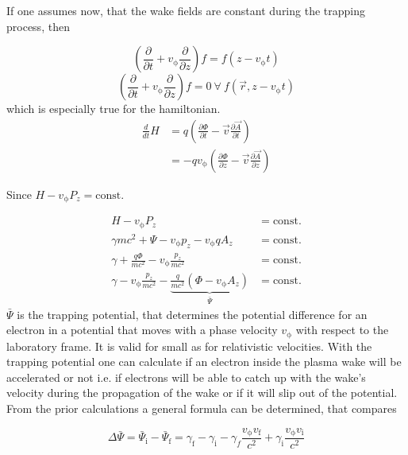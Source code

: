 If one assumes now, that the wake fields are constant during the trapping process, then 

\begin{equation}
(\frac{\partial}{\partial t}+v_\mathrm{\phi} \frac{\partial}{\partial z} ) f =   f ( z-v_\mathrm{\phi} t)
\end{equation}\begin{equation}
(\frac{\partial}{\partial t}+v_\mathrm{\phi} \frac{\partial}{\partial z} ) f =0 \ \forall \   f (\vec{r}, z-v_\mathrm{\phi} t)
\end{equation}
which is especially true for the hamiltonian.
\begin{align*}
\frac{d}{dt}H&=q(\frac{\partial \Phi}{\partial t}-\vec{v}\frac{\partial \vec{A}}{\partial t})\\
&=-q v_\mathrm{\phi}(\frac{\partial \Phi}{\partial z}-\vec{v} \frac{\partial \vec{A}}{\partial z}) 
\end{align*}

Since $H-v_\mathrm{\phi}P_z=\mathrm{const.}$

\begin{align}
H-v_\mathrm{\phi}P_z &= \mathrm{const.}\\
\gamma m c^2+\Psi-v_\mathrm{\phi}p_z-v_\mathrm{\phi}qA_z &= \mathrm{const.}\\
\gamma+\frac{q \Phi}{m c^2}-v_\mathrm{\phi} \frac{p_z}{mc^2} &= \mathrm{const.}\\
\gamma - v_\mathrm{\phi} \frac{p_z}{mc^2}- \underbrace{\frac{q}{mc^2}(\Phi-v_\mathrm{\phi}A_z)}_{\bar{\Psi}}  &= \mathrm{const.} 
\end{align}
$\bar{\Psi}$ is the trapping potential, that determines the potential difference for an electron in a potential that moves with a phase velocity $v_\mathrm{\phi}$ with respect to the laboratory frame. It is valid for small as for relativistic velocities.
With the trapping potential one can calculate if an electron inside the plasma wake will be accelerated or not i.e. if electrons will be able to catch up with the wake's velocity during the propagation of the wake or if it will slip out of the potential.
From the prior calculations a general formula can be determined, that compares

\begin{equation}
\label{eq:Trapping_Potential_Pre}
\Delta \bar{\Psi}= \bar{\Psi}_\mathrm{i}-\bar{\Psi}_\mathrm{f}=\gamma_\mathrm{f}-\gamma_\mathrm{i}-\gamma_f\frac{v_\mathrm{\phi}v_\mathrm{f}}{c^2}+\gamma_\mathrm{i}\frac{v_\mathrm{\phi}v_\mathrm{i}}{c^2} 
\end{equation}


